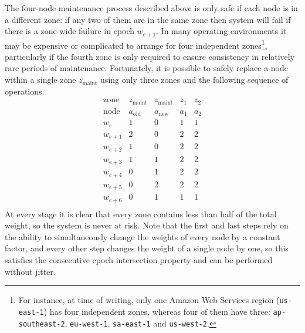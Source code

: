 \documentclass[journal]{IEEEtran}
\begin{document}
The four-node maintenance process described above is only safe if each node is
in a different zone: if any two of them are in the same zone then system will
fail if there is a zone-wide failure in epoch $w_{e+1}$.  In many operating
environments it may be expensive or complicated to arrange for four independent
zones\footnote{For instance, at time of writing, only one Amazon Web Services
region (\texttt{us-east-1}) has four independent zones, whereas four of them
have three: \texttt{ap-southeast-2}, \texttt{eu-west-1}, \texttt{sa-east-1} and
\texttt{us-west-2}.}, particularly if the fourth zone is only required to
ensure consistency in relatively rare periods of maintenance.  Fortunately, it
is possible to safely replace a node within a single zone $z_{\textrm{maint}}$
using only three zones and the following sequence of operations.
\[\begin{array}{rcccc}
\textrm{zone}&z_{\textrm{maint}}&z_{\textrm{maint}}&z_1&z_2\\
\textrm{node}&a_{\textrm{old}}&a_{\textrm{new}}&a_1&a_2\\
w_e&1&0&1&1\\
w_{e+1}&2&0&2&2\\
w_{e+2}&1&0&2&2\\
w_{e+3}&1&1&2&2\\
w_{e+4}&0&1&2&2\\
w_{e+5}&0&2&2&2\\
w_{e+6}&0&1&1&1\\
\end{array}\]
At every stage it is clear that every zone contains less than half of the total
weight, so the system is never at risk. Note that the first and last steps rely
on the ability to simultaneously change the weights of every node by a constant
factor, and every other step changes the weight of a single node by one, so
this satisfies the consecutive epoch intersection property and can be performed
without jitter.



%
%
\end{document}
